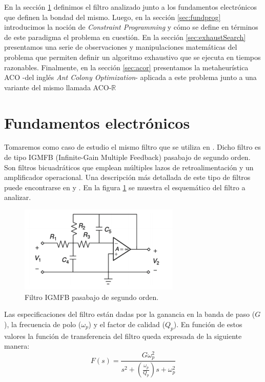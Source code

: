 \documentclass{llncs}
\begin{document}
    En la sección \ref{sec:fundelect} definimos el filtro analizado
    junto a los fundamentos electrónicos que definen la bondad del mismo. Luego, en la
    sección \ref{sec:fundprog} introducimos la noción de \textit{Constraint Programming}
    y cómo se define en términos de este paradigma el problema en cuestión. En la sección
    \ref{sec:exhaustSearch} presentamos una serie de observaciones y manipulaciones matemáticas 
    del problema que permiten definir un algoritmo exhaustivo que se ejecuta
    en tiempos razonables. Finalmente, en la sección \ref{sec:acor} presentamos la metaheurística ACO
    -del inglés \textit{Ant Colony Optimization}- aplicada a este problema junto a una variante 
    del mismo llamada ACO-$\mathbb{R} $
    
    
  \section{\textbf{Fundamentos electrónicos}}
    \label{sec:fundelect}
    Tomaremos como caso de estudio el mismo filtro que se utiliza en \cite{lov:rom:per}. Dicho filtro
    es de tipo IGMFB (Infinite-Gain Multiple Feedback) pasabajo de segundo orden. Son filtros
    bicuadráticos que emplean múltiples lazos de retroalimentación y un amplificador operacional.
    Una descripción más detallada de este tipo de filtros puede encontrarse en \cite{dim} y \cite{rau:swa}. 
    En la figura \ref{fig:filter} se muestra el esquemático del filtro a analizar.
   
   \begin{figure}
   	\includegraphics[width=\linewidth]{filter.png}
   	\caption{Filtro IGMFB pasabajo de segundo orden.}
   	\label{fig:filter}
   \end{figure}

	Las especificaciones del filtro están dadas por la ganancia en la banda de paso ($G$), la
	frecuencia de polo ($\omega_p$) y el factor de calidad ($Q_p$). En función de estos valores
	la función de transferencia del filtro queda expresada de la siguiente manera:
 	\begin{equation}
		F(s) = \frac{G\omega_p^2}{s^2+(\frac{\omega_p}{Q_p})s+\omega_p^2}
		\label{funcTransfer}
	\end{equation}
	
\end{document}

